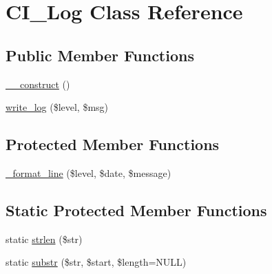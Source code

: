 \hypertarget{class_c_i___log}{}\section{C\+I\+\_\+\+Log Class Reference}
\label{class_c_i___log}
\subsection*{Public Member Functions}
\begin{DoxyCompactItemize}
\item 
\mbox{\hyperlink{class_c_i___log_af5605c4ff273176a36b6e4dc4876201f}{\+\_\+\+\_\+construct}} ()
\item 
\mbox{\hyperlink{class_c_i___log_a7fabf953748da6685e54430e7f200ac8}{write\+\_\+log}} (\$level, \$msg)
\end{DoxyCompactItemize}
\subsection*{Protected Member Functions}
\begin{DoxyCompactItemize}
\item 
\mbox{\hyperlink{class_c_i___log_ab5bf7e6663af7019bd38f9540a344459}{\+\_\+format\+\_\+line}} (\$level, \$date, \$message)
\end{DoxyCompactItemize}
\subsection*{Static Protected Member Functions}
\begin{DoxyCompactItemize}
\item 
static \mbox{\hyperlink{class_c_i___log_ac0f92584d5cc1950011d586914893e22}{strlen}} (\$str)
\item 
static \mbox{\hyperlink{class_c_i___log_ae16a11c82c09f1b2bb5d8ecba7468acb}{substr}} (\$str, \$start, \$length=N\+U\+LL)
\end{DoxyCompactItemize}
